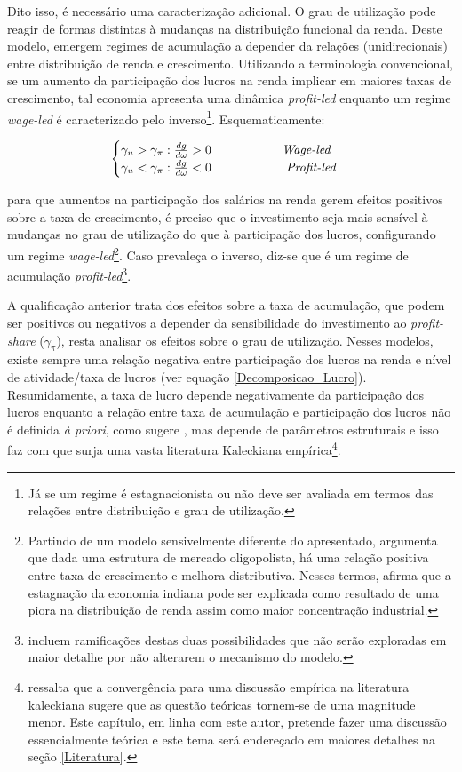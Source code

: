 Dito isso, é necessário uma  caracterização adicional. O grau de utilização pode reagir de formas distintas à mudanças na distribuição funcional da renda. Deste modelo, emergem regimes de acumulação a depender da relações (unidirecionais) entre distribuição de renda e crescimento. Utilizando a terminologia convencional, se um aumento da participação dos lucros na renda implicar em maiores taxas de crescimento, tal economia apresenta uma dinâmica \textit{profit-led} enquanto um regime \textit{wage-led} é caracterizado pelo inverso\footnote{Já se um regime é estagnacionista ou não deve ser avaliada em termos das relações entre distribuição e grau de utilização.}. Esquematicamente:

\begin{center}
$$
\begin{cases}
\gamma_u > \gamma_{\pi}:\frac{dg}{d\omega} > 0\hspace{2cm} \text{\textit{Wage-led}}\\
\gamma_u < \gamma_{\pi}:\frac{dg}{d\omega} < 0 \hspace{2cm} \text{          \textit{Profit-led}}
\end{cases}
$$
\end{center}
para que aumentos na participação dos salários na renda gerem efeitos positivos sobre a taxa de crescimento, é preciso que o investimento seja mais sensível à mudanças no grau de utilização do que à participação dos lucros, configurando um regime \textit{wage-led}\footnote{
Partindo de um modelo sensivelmente diferente do apresentado, \textcite{dutt_stagnation_1984} argumenta que dada uma estrutura de mercado oligopolista, há uma relação positiva entre taxa de crescimento e melhora distributiva. Nesses termos, afirma que a estagnação da economia indiana pode ser explicada como resultado de uma piora na distribuição de renda assim como maior concentração industrial.}.  Caso prevaleça o inverso, diz-se que é um regime de acumulação \textit{profit-led}\footnote{\textcite{bhaduri_unemployment_1990} incluem ramificações destas duas possibilidades que não serão exploradas em maior detalhe por não alterarem o mecanismo do modelo.}.

A qualificação anterior trata dos efeitos sobre a taxa de acumulação, que podem ser positivos ou negativos a depender da sensibilidade do investimento ao \textit{profit-share} ($\gamma_{\pi}$), resta analisar os efeitos sobre o grau de utilização. Nesses modelos, existe sempre uma relação negativa entre participação dos lucros na renda e nível de atividade/taxa de lucros (ver equação \ref{Decomposicao_Lucro}). Resumidamente, a taxa de lucro depende negativamente da participação dos lucros enquanto a relação entre taxa de acumulação e participação dos lucros não é definida \textit{à priori}, como sugere \textcite{bhaduri_unemployment_1990}, mas depende de parâmetros estruturais e isso faz com que surja uma vasta literatura Kaleckiana empírica\footnote{\textcite{pariboni_autonomous_2015} ressalta que a convergência para uma discussão empírica na literatura kaleckiana sugere que as questão teóricas tornem-se de uma magnitude menor. Este capítulo, em linha com este autor, pretende fazer uma discussão essencialmente teórica e este tema será endereçado em maiores detalhes na seção \ref{Literatura}.}.

